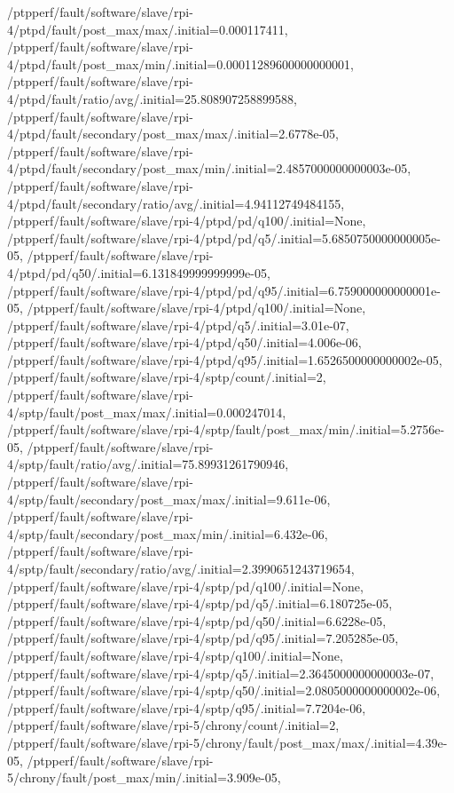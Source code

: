 {    /ptpperf/fault/software/slave/rpi-4/ptpd/fault/post_max/max/.initial=0.000117411,
    /ptpperf/fault/software/slave/rpi-4/ptpd/fault/post_max/min/.initial=0.00011289600000000001,
    /ptpperf/fault/software/slave/rpi-4/ptpd/fault/ratio/avg/.initial=25.808907258899588,
    /ptpperf/fault/software/slave/rpi-4/ptpd/fault/secondary/post_max/max/.initial=2.6778e-05,
    /ptpperf/fault/software/slave/rpi-4/ptpd/fault/secondary/post_max/min/.initial=2.4857000000000003e-05,
    /ptpperf/fault/software/slave/rpi-4/ptpd/fault/secondary/ratio/avg/.initial=4.94112749484155,
    /ptpperf/fault/software/slave/rpi-4/ptpd/pd/q100/.initial=None,
    /ptpperf/fault/software/slave/rpi-4/ptpd/pd/q5/.initial=5.6850750000000005e-05,
    /ptpperf/fault/software/slave/rpi-4/ptpd/pd/q50/.initial=6.131849999999999e-05,
    /ptpperf/fault/software/slave/rpi-4/ptpd/pd/q95/.initial=6.759000000000001e-05,
    /ptpperf/fault/software/slave/rpi-4/ptpd/q100/.initial=None,
    /ptpperf/fault/software/slave/rpi-4/ptpd/q5/.initial=3.01e-07,
    /ptpperf/fault/software/slave/rpi-4/ptpd/q50/.initial=4.006e-06,
    /ptpperf/fault/software/slave/rpi-4/ptpd/q95/.initial=1.6526500000000002e-05,
    /ptpperf/fault/software/slave/rpi-4/sptp/count/.initial=2,
    /ptpperf/fault/software/slave/rpi-4/sptp/fault/post_max/max/.initial=0.000247014,
    /ptpperf/fault/software/slave/rpi-4/sptp/fault/post_max/min/.initial=5.2756e-05,
    /ptpperf/fault/software/slave/rpi-4/sptp/fault/ratio/avg/.initial=75.89931261790946,
    /ptpperf/fault/software/slave/rpi-4/sptp/fault/secondary/post_max/max/.initial=9.611e-06,
    /ptpperf/fault/software/slave/rpi-4/sptp/fault/secondary/post_max/min/.initial=6.432e-06,
    /ptpperf/fault/software/slave/rpi-4/sptp/fault/secondary/ratio/avg/.initial=2.3990651243719654,
    /ptpperf/fault/software/slave/rpi-4/sptp/pd/q100/.initial=None,
    /ptpperf/fault/software/slave/rpi-4/sptp/pd/q5/.initial=6.180725e-05,
    /ptpperf/fault/software/slave/rpi-4/sptp/pd/q50/.initial=6.6228e-05,
    /ptpperf/fault/software/slave/rpi-4/sptp/pd/q95/.initial=7.205285e-05,
    /ptpperf/fault/software/slave/rpi-4/sptp/q100/.initial=None,
    /ptpperf/fault/software/slave/rpi-4/sptp/q5/.initial=2.3645000000000003e-07,
    /ptpperf/fault/software/slave/rpi-4/sptp/q50/.initial=2.0805000000000002e-06,
    /ptpperf/fault/software/slave/rpi-4/sptp/q95/.initial=7.7204e-06,
    /ptpperf/fault/software/slave/rpi-5/chrony/count/.initial=2,
    /ptpperf/fault/software/slave/rpi-5/chrony/fault/post_max/max/.initial=4.39e-05,
    /ptpperf/fault/software/slave/rpi-5/chrony/fault/post_max/min/.initial=3.909e-05,
}
